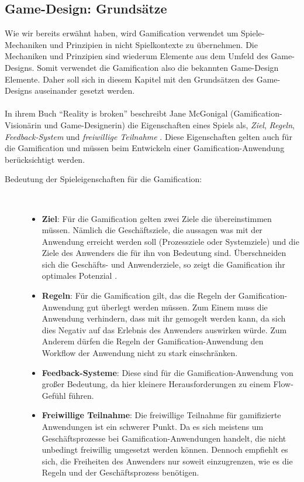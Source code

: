 \documentclass[a4paper,12pt,twoside]{scrartcl}
\begin{document}
\subsection{Game-Design: Grundsätze}
\label{Game-Design Grundsätze}
Wie wir bereits erwähnt haben, wird Gamification verwendet um Spiele-Mechaniken und Prinzipien in nicht Spielkontexte zu übernehmen. Die Mechaniken und Prinzipien sind wiederum Elemente aus dem Umfeld des Game-Designs. Somit verwendet die Gamification also die bekannten Game-Design Elemente. Daher soll sich in diesem Kapitel mit den Grundsätzen des Game-Designs auseinander gesetzt werden.
\\\\
In ihrem Buch \enquote{Reality is broken} beschreibt Jane McGonigal (Gamification-Visionärin und Game-Designerin) die Eigenschaften eines Spiels als, \textit{Ziel}, \textit{Regeln}, \textit{Feedback-System} und \textit{freiwillige Teilnahme} \cite{Mcgonigal2011}. Diese Eigenschaften gelten auch für die Gamification und müssen beim Entwickeln einer Gamification-Anwendung berücksichtigt werden.
\begin{description}
   \item[Bedeutung der Spieleigenschaften für die Gamification:]~\par
   \begin{itemize}
      \item \textbf{Ziel}: Für die Gamification gelten zwei Ziele die übereinstimmen müssen. Nämlich die Geschäftsziele, die aussagen was mit der Anwendung erreicht werden soll (Prozessziele oder Systemziele) und die Ziele des Anwenders die für ihn von Bedeutung sind. Überschneiden sich die Geschäfts- und Anwenderziele, so zeigt die Gamification ihr optimales Potenzial \cite{gamificationDefinition}. 
      \item \textbf{Regeln}: Für die Gamification gilt, das die Regeln der Gamification-Anwendung gut überlegt werden müssen. Zum Einem muss die Anwendung verhindern, dass mit ihr gemogelt werden kann, da sich dies Negativ auf das Erlebnis des Anwenders auswirken würde. Zum Anderem dürfen die Regeln der Gamification-Anwendung den Workflow der Anwendung nicht zu stark einschränken.
      \item \textbf{Feedback-Systeme}: Diese sind für die Gamification-Anwendung von großer Bedeutung, da hier kleinere Herausforderungen zu einem Flow-Gefühl führen.
      \item \textbf{Freiwillige Teilnahme}: Die freiwillige Teilnahme für gamifizierte Anwendungen ist ein schwerer Punkt. Da es sich meistens um Geschäftsprozesse bei Gamification-Anwendungen handelt, die nicht unbedingt freiwillig umgesetzt werden können. Dennoch empfiehlt es sich, die Freiheiten des Anwenders nur soweit einzugrenzen, wie es die Regeln und der Geschäftsprozess benötigen. 
   \end{itemize}
\end{description}
\end{document}
